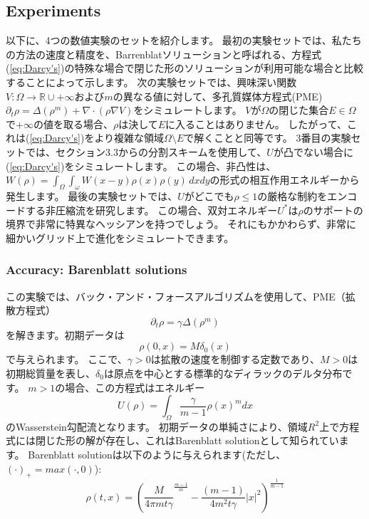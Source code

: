 \documentclass{jsarticle}
\theoremstyle{definition}
\begin{document}
\subsection{Experiments}
以下に、4つの数値実験のセットを紹介します。
最初の実験セットでは、私たちの方法の速度と精度を、Barrenblatソリューションと呼ばれる、方程式(\ref{eq:Darcy's})の特殊な場合で閉じた形のソリューションが利用可能な場合と比較することによって示します。
次の実験セットでは、興味深い関数$V: \Omega \to \mathbb{R} \cup {+ \infty}$および$m$の異なる値に対して、多孔質媒体方程式(PME)$\partial_t \rho = \Delta (\rho^m) + \nabla \cdot (\rho \nabla V)$をシミュレートします。
$V$が$\Omega$の閉じた集合$E \in \Omega$で$+ \infty$の値を取る場合、$\rho$は決して$E$に入ることはありません。
したがって、これは(\ref{eq:Darcy's})をより複雑な領域$\Omega \setminus  E$で解くことと同等です。
3番目の実験セットでは、セクション3.3からの分割スキームを使用して、$U$が凸でない場合に(\ref{eq:Darcy's})をシミュレートします。
この場合、非凸性は、$W(\rho) = \int_\Omega \int_\omega W(x - y) \rho(x)\rho(y) \,dx dy$の形式の相互作用エネルギーから発生します。
最後の実験セットでは、$U$がどこでも$\rho \le 1$の厳格な制約をエンコードする非圧縮流を研究します。
この場合、双対エネルギー$U^*$は$\rho$のサポートの境界で非常に特異なヘッシアンを持つでしょう。
それにもかかわらず、非常に細かいグリッド上で進化をシミュレートできます。





\subsubsection{Accuracy: Barenblatt solutions}


この実験では、バック・アンド・フォースアルゴリズムを使用して、PME（拡散方程式）
\begin{equation}
    \label{eq:PME}
    \partial_t\rho = \gamma\Delta(\rho^m)
\end{equation}
を解きます。初期データは
\[
    \rho(0,x) = M\delta_0(x)
\]
で与えられます。
ここで、\(\gamma > 0\)は拡散の速度を制御する定数であり、\(M > 0\)は初期総質量を表し、\(\delta_0\)は原点を中心とする標準的なディラックのデルタ分布です。
\(m > 1\)の場合、この方程式はエネルギー
\[
    U(\rho) = \int_\Omega \frac{\gamma}{m - 1}\rho(x)^m dx
\]
のWasserstein勾配流となります。
初期データの単純さにより、領域\(R^2\)上で方程式には閉じた形の解が存在し、これはBarenblatt solutionとして知られています。
Barenblatt solutionは以下のように与えられます(ただし、$(\cdot)_+ = max(\cdot, 0)$):
\begin{equation}
    \label{eq:barenblatt}
    \rho(t,x)= \left( \frac{M}{4\pi m t \gamma}^{\frac{m - 1}{m}} - \frac{(m - 1)}{4m^2t\gamma}|x|^2 \right)^{\frac{1}{m - 1}}
\end{equation}
\end{document}
